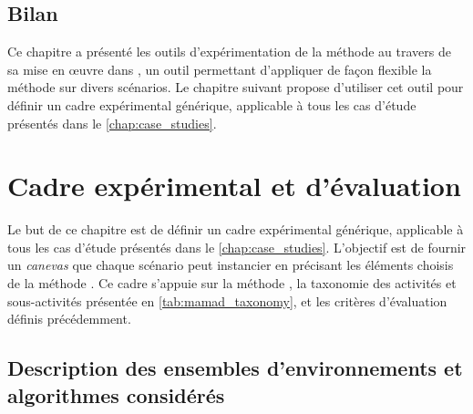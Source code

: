 \section*{Bilan}

Ce chapitre a présenté les outils d'expérimentation de la méthode  au travers de sa mise en œuvre dans , un outil permettant d'appliquer de façon flexible la méthode sur divers scénarios. Le chapitre suivant propose d'utiliser cet outil pour définir un cadre expérimental générique, applicable à tous les cas d'étude présentés dans le \autoref{chap:case_studies}.


\clearpage
\thispagestyle{empty}
\null
\newpage

\chapter{Cadre expérimental et d'évaluation}
\label{chap:cadre_experimental}

Le but de ce chapitre est de définir un cadre expérimental générique, applicable à tous les cas d'étude présentés dans le \autoref{chap:case_studies}. L'objectif est de fournir un \textit{canevas} que chaque scénario peut instancier en précisant les éléments choisis de la méthode . Ce cadre s'appuie sur la méthode , la taxonomie des activités et sous-activités présentée en \autoref{tab:mamad_taxonomy}, et les critères d'évaluation définis précédemment.

\section{Description des ensembles d'environnements et algorithmes considérés}

